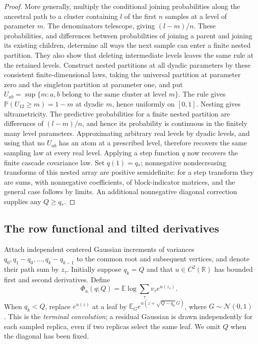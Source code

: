 \documentclass[11pt,a4paper]{article}
\numberwithin{equation}{section}
\theoremstyle{definition}
\theoremstyle{remark}
\newcommand{\E}{\mathbb E}
\newcommand{\Prob}{\mathbb P}
\newcommand{\R}{\mathbb R}
\newcommand{\cN}{\mathcal N}
\begin{document}
\begin{proof}
More generally, multiply the conditional joining probabilities along the
ancestral path to a cluster containing $l$ of the first $n$ samples at a
level of parameter $m$.  The denominators telescope, giving
$(l-m)/n$.  These probabilities, and differences between probabilities of
joining a parent and joining its existing children, determine all ways
the next sample can enter a finite nested partition.  They also show that
deleting intermediate levels leaves the same rule at the retained levels.
Construct nested partitions at all dyadic parameters by these consistent
finite-dimensional laws, taking the universal partition at parameter zero
and the singleton partition at parameter one, and put
$U_{ab}=\sup\{m:a,b\text{ belong to the same cluster at level }m\}$.
The rule gives $\Prob(U_{12}\ge m)=1-m$ at dyadic $m$, hence uniformly on
$[0,1]$.  Nesting gives ultrametricity.  The predictive probabilities for a
finite nested partition are differences of $(l-m)/n$, and hence its
probability is continuous in the finitely many level parameters.
Approximating arbitrary real levels by dyadic levels, and using that no
$U_{ab}$ has an atom at a prescribed level, therefore recovers the same
sampling law at every real level.  Applying a step function $q$ now recovers
the finite cascade covariance law.  Set $q(1)=q_*$; nonnegative
nondecreasing transforms of this nested array are positive semidefinite:
for a step transform they are sums, with nonnegative coefficients, of
block-indicator matrices, and the general case follows by limits.  An
additional nonnegative diagonal correction supplies any $Q\ge q_*$.
\end{proof}

\subsection{The row functional and tilted derivatives}

Attach independent centered Gaussian increments of variances
$q_0,q_1-q_0,\ldots,q_k-q_{k-1}$ to the common root and subsequent vertices,
and denote their path sum by $z_\tau$.  Initially suppose $q_k=Q$ and that
$u\in C^2(\R)$ has bounded first and second derivatives.  Define
\[
 \Phi_u(q;Q)=\E\log\sum_\tau v_\tau e^{u(z_\tau)}.
\]
When $q_k<Q$, replace $e^{u(z)}$ at a leaf by
$\E_G e^{u(z+\sqrt{Q-q_k}\,G)}$, where $G\sim\cN(0,1)$.
This is the \emph{terminal convolution}; a residual Gaussian is drawn
independently for each sampled replica, even if two replicas select the
same leaf.  We omit $Q$ when the diagonal has been fixed.
\end{document}

